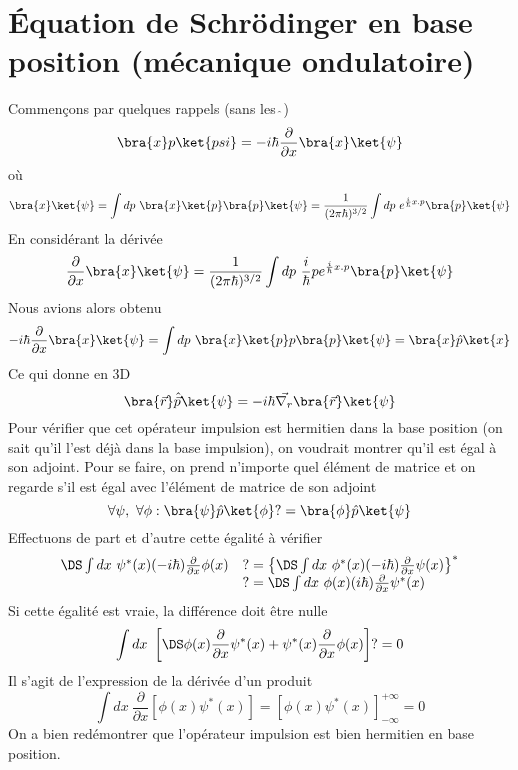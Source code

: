 	

\section{Équation de Schrödinger en base position (mécanique ondulatoire)}
Commençons par quelques rappels (sans les $\hat{\ }$)
\begin{equation}
\bra{x}p\ket{psi} = -i\hbar \frac{\partial}{\partial x}\bra{x}\ket{\psi}
\end{equation}
où 
\begin{equation}
\bra{x}\ket{\psi} = \int dp\ \bra{x}\ket{p}\bra{p}\ket{\psi} = \frac{1}{(2\pi\hbar)^{3/2}}
\int dp\ e^{\frac{i}{\hbar}x.p}\bra{p}\ket{\psi}
\end{equation}
En considérant la dérivée
\begin{equation}
\frac{\partial}{\partial x}\bra{x}\ket{\psi} = \frac{1}{(2\pi\hbar)^{3/2}}\int dp\ \frac{i}{\hbar}p
e^{\frac{i}{\hbar}x.p}\bra{p}\ket{\psi}
\end{equation}
Nous avions alors obtenu
\begin{equation}
-i\hbar\frac{\partial}{\partial x}\bra{x}\ket{\psi} = \int dp\ \bra{x}\ket{p}p\bra{p}\ket{\psi} = 
\bra{x}\hat{p}\ket{x}
\end{equation}
Ce qui donne en 3D
\begin{equation}
\bra{\vec{r}}\hat{\vec{p}}\ket{\psi} = -i\hbar\vec{\nabla_r}\bra{\vec{r}}\ket{\psi}
\end{equation}
Pour vérifier que cet opérateur impulsion est hermitien dans la base position (on sait qu'il
l'est déjà dans la base impulsion), on voudrait montrer qu'il est égal à son 
adjoint. Pour se faire, on prend n'importe quel élément de matrice et on regarde s'il est égal avec
l'élément de matrice de son adjoint
\begin{equation}
\forall\psi,\ \forall \phi : \bra{\psi}\hat{p}\ket{\phi} ?= \bra{\phi}\hat{p}\ket{\psi}
\end{equation}
Effectuons de part et d'autre cette égalité à vérifier
\begin{equation}
\begin{array}{ll}
\DS \int dx\ \psi^*(x)(-i\hbar)\frac{\partial}{\partial x}\phi(x) &?= \left\{\DS \int dx\ \phi^*(x)(-i\hbar)
\frac{\partial}{\partial x}\psi(x)\right\}^*\\
&?=\DS \int dx\ \phi(x)(i\hbar)\frac{\partial}{\partial x}\psi^*(x)
\end{array}
\end{equation}
Si cette égalité est vraie, la différence doit être nulle
\begin{equation}
\int dx\ \left[\DS \phi(x)\frac{\partial}{\partial x}\psi^*(x) + \psi^*(x)\frac{\partial}{\partial x}\phi(x)
\right]?=0
\end{equation}
Il s'agit de l'expression de la dérivée d'un produit
\begin{equation}
\int dx\ \dfrac{\partial}{\partial x}\left[\phi(x)\psi^*(x)\right] = \left[\phi(x)\psi^*(x)\right]_{-\infty}^{
+\infty} = 0
\end{equation}
On a bien redémontrer que l'opérateur impulsion est bien hermitien en base position. \\

